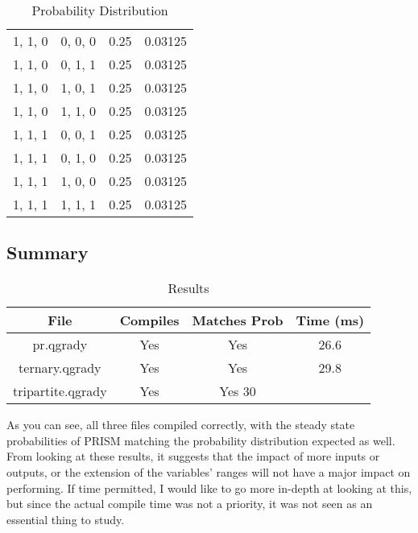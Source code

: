 \documentclass[report.tex]{subfiles}
\begin{document}
\begin{table}[H]
\begin{tabular}{c | c | c | c}
    1, 1, 0 & 0, 0, 0 & 0.25 & 0.03125 \\
    1, 1, 0 & 0, 1, 1 & 0.25 & 0.03125 \\
    1, 1, 0 & 1, 0, 1 & 0.25 & 0.03125 \\
    1, 1, 0 & 1, 1, 0 & 0.25 & 0.03125 \\
    1, 1, 1 & 0, 0, 1 & 0.25 & 0.03125 \\
    1, 1, 1 & 0, 1, 0 & 0.25 & 0.03125 \\
    1, 1, 1 & 1, 0, 0 & 0.25 & 0.03125 \\
    1, 1, 1 & 1, 1, 1 & 0.25 & 0.03125 \\
  \end{tabular}
  \caption{Probability Distribution}
  \label{tab:threeinputs_qgrady}
\end{table}


\subsection{Summary} %
\label{sub:prism_summary}
\begin{table}[H]
  \centering
  \begin{tabular}{c | c | c | c}
    File & Compiles & Matches Prob & Time (ms)\\
    \hline
    pr.qgrady & Yes & Yes & 26.6 \\
    ternary.qgrady & Yes & Yes & 29.8 \\
    tripartite.qgrady & Yes & Yes 30\\
  \end{tabular}
  \caption{Results}
  \label{tab:prism_results}
\end{table}

As you can see, all three files compiled correctly, with the steady state 
probabilities of PRISM matching the probability distribution expected as well.
From looking at these results, it suggests that the impact of more inputs or
outputs, or the extension of the variables' ranges will not have a major
impact on performing. If time permitted, I would like to go more in-depth at
looking at this, but since the actual compile time was not a priority, it was
not seen as an essential thing to study.
\newpage
\end{document}
